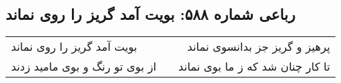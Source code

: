 \begin{center}
\section*{رباعی شماره ۵۸۸: بویت آمد گریز را روی نماند}
\label{sec:0588}
\begin{longtable}{l p{0.5cm} r}
بویت آمد گریز را روی نماند
&&
پرهیز و گریز جز بدانسوی نماند
\\
از بوی تو رنگ و بوی مامید زدند
&&
تا کار چنان شد که ز ما بوی نماند
\\
\end{longtable}
\end{center}

